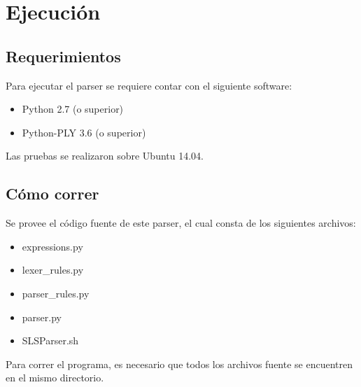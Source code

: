 \section{Ejecución}

\subsection{Requerimientos}

Para ejecutar el parser se requiere contar con el siguiente software:

\begin{itemize}
\item Python 2.7 (o superior)
\item Python-PLY 3.6 (o superior)
\end{itemize}

Las pruebas se realizaron sobre Ubuntu 14.04.

\subsection{Cómo correr}

Se provee el código fuente de este parser, el cual consta de los siguientes archivos:

\begin{itemize}
\item expressions.py
\item lexer_rules.py
\item parser_rules.py
\item parser.py
\item SLSParser.sh
\end{itemize}

Para correr el programa, es necesario que todos los archivos fuente se encuentren en el mismo directorio.

